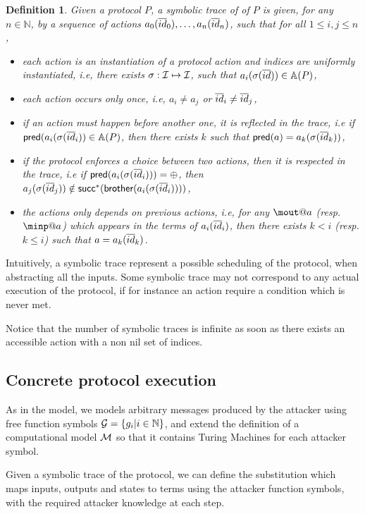 \documentclass[a4paper]{article}
\newtheorem{definition}{Definition}
\theoremstyle{remark}
\begin{document}
\begin{definition}
  Given a protocol $P$, a symbolic trace of of $P$ is given, for any $n\in\mathbb{N}$, by a sequence of actions $a_0 (\overline{id}_0),\dots,a_n (\overline{id}_n)$, such that for all $1 \leq i,j \leq n$,
  \begin{itemize}
    \item each action is an instantiation of a protocol action and indices are uniformly instantiated, i.e, there exists $\sigma : \mathcal{I} \mapsto \mathcal{I}$, such that $a_i (\sigma (\overline{id})) \in\mathbb{A}(P)$,
    \item each action occurs only once, i.e, $a_i \neq{} a_j$ or $\overline{id}_i \neq\overline{id}_j$,
    \item if an action must happen before another one, it is reflected in the trace, i.e
      if $\textsf{pred} (a_i(\sigma(\overline{id}_i)) \in \mathbb{A}(P)$, then there exists $k$ such that $\textsf{pred}(a) = a_k(\sigma(\overline{id}_k))$,
    \item if the protocol enforces a choice between two actions, then it is respected in the trace, i.e if $\textsf{pred}(a_i(\sigma(\overline{id}_i))) = \oplus$, then $a_j(\sigma(\overline{id}_j)) \notin \textsf{succ}^*(\textsf{brother} (a_i(\sigma(\overline{id}_i))))$,
      \item the actions only depends on previous actions, i.e, for any $\mout@a$ (resp. $\minp@a$) which appears in the terms of $a_i(\overline{id}_i)$, then there exists $k < i$ (resp. $k \leq i$) such that $a = a_k(\overline{id}_k)$.
      \end{itemize}
\end{definition}
Intuitively, a symbolic trace represent a possible scheduling of the protocol, when abstracting all the inputs. Some symbolic trace may not correspond to any actual execution of the protocol, if for instance an action require a condition which is never met.

Notice that the number of symbolic traces is infinite as soon as there exists an accessible action with a non nil set of indices.


\subsection{Concrete protocol execution}
As in the \BC model, we models arbitrary messages produced by the attacker using free function symbols $\mathcal{G} = \{g_i | i \in \mathbb{N}\} $, and extend the definition of a computational model $\mathcal{M}$ so that it contains Turing Machines for each attacker symbol.

Given a symbolic trace of the protocol, we can define the substitution which maps inputs, outputs and states to terms using the attacker function symbols, with the required attacker knowledge at each step.
\end{document}
